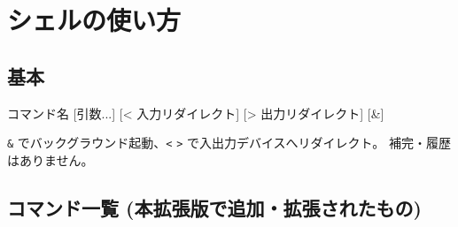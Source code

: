 \documentclass[a4paper,11pt]{ltjsarticle}
\begin{document}
\section{シェルの使い方}
\subsection{基本}
\begin{code}
コマンド名 [引数...]    [< 入力リダイレクト] [> 出力リダイレクト] [&]
\end{code}
\verb|&| でバックグラウンド起動、\verb|<| \verb|>| で入出力デバイスへリダイレクト。
補完・履歴はありません。

\subsection{コマンド一覧 (本拡張版で追加・拡張されたもの)}
\end{document}
